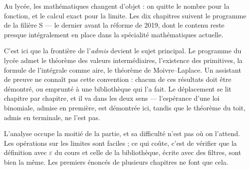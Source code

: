 Au lycée, les mathématiques changent d'objet : on quitte le nombre pour la fonction, et le
calcul exact pour la limite. Les dix chapitres suivent le programme de la filière S — le
dernier avant la réforme de 2019, dont le contenu reste presque intégralement en place dans
la spécialité mathématiques actuelle.

C'est ici que la frontière de l'\emph{admis} devient le sujet principal. Le programme du
lycée admet le théorème des valeurs intermédiaires, l'existence des primitives, la formule
de l'intégrale comme aire, le théorème de Moivre--Laplace. Un assistant de preuve ne connaît
pas cette convention : chacun de ces résultats doit être démontré, ou emprunté à une
bibliothèque qui l'a fait. Le déplacement se lit chapitre par chapitre, et il va dans les
deux sens — l'espérance d'une loi binomiale, admise en première, est démontrée ici, tandis
que le théorème du toit, admis en terminale, ne l'est pas.

L'analyse occupe la moitié de la partie, et sa difficulté n'est pas où on l'attend. Les
opérations sur les limites sont faciles ; ce qui coûte, c'est de vérifier que la définition
avec $\varepsilon$ du cours et celle de la bibliothèque, écrite avec des filtres, sont bien
la même. Les premiers énoncés de plusieurs chapitres ne font que cela.
